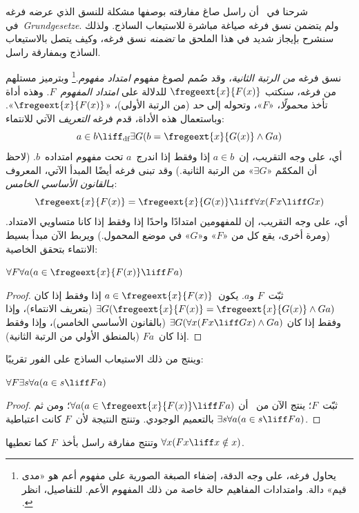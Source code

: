 \documentclass[../../../include/open-logic-section]{subfiles}
\begin{document}


شرحنا في~ أن راسل صاغ مفارقته بوصفها مشكلة للنسق
الذي عرضه فرغه في~\emph{Grundgesetze}. ولم يتضمن نسق فرغه صياغة
مباشرة للاستيعاب الساذج. ولذلك سنشرح بإيجاز شديد في هذا الملحق ما
\emph{تضمنه} نسق فرغه، وكيف يتصل بالاستيعاب الساذج وبمفارقة راسل.

نسق فرغه \emph{من الرتبة الثانية}، وقد صُمم لصوغ مفهوم
\emph{امتداد مفهوم}.\footnote{يحاول فرغه، على وجه الدقة، إضفاء الصبغة
  الصورية على مفهوم أعم هو «مدى قيم» دالة. وامتدادات المفاهيم حالة خاصة
  من ذلك المفهوم الأعم. للتفاصيل، انظر
  \citet[pp.\ 8--9]{Heck2012}.} وبترميز مستلهم من فرغه، سنكتب
$\fregeext{x}{F(x)}$ للدلالة على \emph{امتداد المفهوم~$F$}. وهذه
أداة تأخذ \emph{محمولًا}، «$F$»، وتحوله إلى \emph{حد} (من الرتبة
الأولى)، «$\fregeext{x}{F(x)}$». وباستعمال هذه الأداة، قدم فرغه
\emph{التعريف} الآتي للانتماء:
\[
	a \in b \liff_\text{df} \exists G(b = \fregeext{x}{G(x)} \land Ga)
\]
أي، على وجه التقريب، إن~$a \in b$ إذا وفقط إذا اندرج~$a$ تحت مفهوم
امتداده~$b$. (لاحظ أن المكمّم «$\exists G$» من الرتبة الثانية.)
وقد تبنى فرغه أيضًا المبدأ الآتي، المعروف بـ\emph{القانون الأساسي
الخامس}:
$$\fregeext{x}{F(x)} = \fregeext{x}{G(x)} \liff \forall x (Fx \liff Gx)$$
أي، على وجه التقريب، إن للمفهومين امتدادًا واحدًا إذا وفقط إذا كانا
متساويي الامتداد. (ومرة أخرى، يقع كل من «$F$» و«$G$» في موضع المحمول.)
ويربط الآن مبدأ بسيط الانتماء بتحقق الخاصية:

\begin{lem}
$\forall F \forall a(a \in \fregeext{x}{F(x)} \liff Fa)$
\end{lem}

\begin{proof}
ثبّت~$F$ و$a$. يكون~$a \in \fregeext{x}{F(x)}$ إذا وفقط إذا كان
$\exists G(\fregeext{x}{F(x)} = \fregeext{x}{G(x)} \land Ga)$
(بتعريف الانتماء)، وإذا وفقط إذا كان
$\exists G(\forall x(Fx \liff Gx) \land Ga)$
(بالقانون الأساسي الخامس)، وإذا وفقط إذا كان~$Fa$
(بالمنطق الأولي من الرتبة الثانية).
\end{proof}

وينتج من ذلك الاستيعاب الساذج على الفور تقريبًا:

\begin{lem}
$\forall F \exists s \forall a (a \in s \liff Fa)$
\end{lem}

\begin{proof}
ثبّت~$F$؛ ينتج الآن من~ أن
$\forall a (a \in \fregeext{x}{F(x)} \liff Fa)$؛ ومن ثم
$\exists s\forall a(a \in s \liff Fa)$ بالتعميم الوجودي. وتنتج النتيجة
لأن~$F$ كانت اعتباطية.
\end{proof}

وتنتج مفارقة راسل بأخذ~$F$ كما تعطيها
$\forall x(Fx \liff x \notin x)$.
\end{document}
